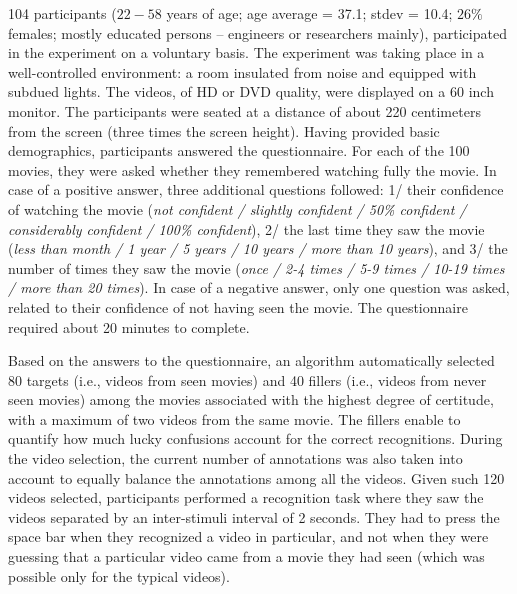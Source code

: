 \documentclass[sigconf]{acmart}
\begin{document}
104 participants ($22-58$ years of age; age average = 37.1; stdev = 10.4; $26\%$ females; mostly educated persons -- engineers or researchers mainly), participated in the experiment on a voluntary basis.
The experiment was taking place in a well-controlled environment: a room insulated from noise and equipped with subdued lights.
The videos, of HD or DVD quality, were displayed on a 60 inch monitor.
The participants were seated at a distance of about 220 centimeters from the screen (three times the screen height).
Having provided basic demographics, participants answered the questionnaire.
For each of the 100 movies, they were asked whether they remembered watching fully the movie.
In case of a positive answer, three additional questions followed: 1/ their confidence of watching the movie (\textit{not confident / slightly confident / 50\% confident / considerably confident / 100\% confident}), 2/ the last time they saw the movie (\textit{less than month / 1 year / 5 years / 10 years / more than 10 years}), and 3/ the number of times they saw the movie (\textit{once / 2-4 times / 5-9 times / 10-19 times / more than 20 times}).
In case of a negative answer, only one question was asked, related to their confidence of not having seen the movie.
The questionnaire required about 20 minutes to complete.

Based on the answers to the questionnaire, an algorithm automatically selected 80 targets (i.e., videos from seen movies) and 40 fillers (i.e., videos from never seen movies) among the movies associated with the highest degree of certitude, with a maximum of two videos from the same movie.
The fillers enable to quantify how much lucky confusions account for the correct recognitions.
During the video selection, the current number of annotations was also taken into account to equally balance the annotations among all the videos.
Given such 120 videos selected, participants performed a recognition task where they saw the videos separated by an inter-stimuli interval of 2 seconds.
They had to press the space bar when they recognized a video in particular, and not when they were guessing that a particular video came from a movie they had seen (which was possible only for the typical videos).

\end{document}
